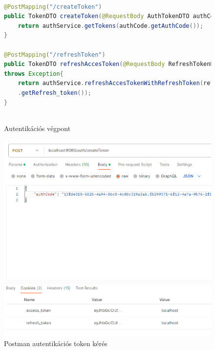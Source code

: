 \documentclass[a4paper,twoside]{article}
\begin{document}
\begin{figure}
	\caption{Autentikációs végpont}
	\centering
	\begin{lstlisting}[language=java]
		
@PostMapping("/createToken")
public TokenDTO createToken(@RequestBody AuthTokenDTO authCode) throws Exception{
	return authService.getTokens(authCode.getAuthCode());
}		

@PostMapping("/refreshToken")
public TokenDTO refreshAccesToken(@RequestBody RefreshTokenDTO refreshTokenDTO)
throws Exception{
	return authService.refreshAccesTokenWithRefreshToken(refreshTokenDTO
	.getRefresh_token());
}
		
	\end{lstlisting}
	\label{authEndpoint}
\end{figure} 
\FloatBarrier

\begin{figure}
	\caption{Postman autentikációs token kérés}
	\label{fig:postman}
	\centering
	\includegraphics[scale=0.5]{getTokens}
\end{figure}
\end{document}
